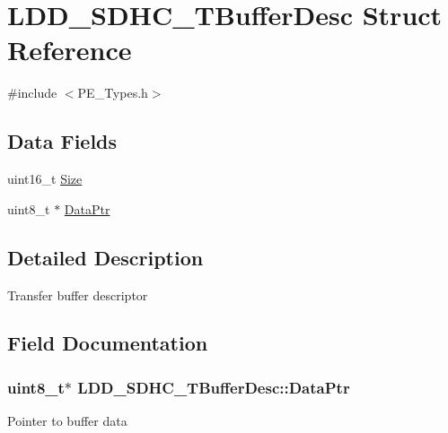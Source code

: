 \hypertarget{struct_l_d_d___s_d_h_c___t_buffer_desc}{}\section{L\+D\+D\+\_\+\+S\+D\+H\+C\+\_\+\+T\+Buffer\+Desc Struct Reference}
\label{struct_l_d_d___s_d_h_c___t_buffer_desc}


{\ttfamily \#include $<$P\+E\+\_\+\+Types.\+h$>$}

\subsection*{Data Fields}
\begin{DoxyCompactItemize}
\item 
uint16\+\_\+t \hyperlink{struct_l_d_d___s_d_h_c___t_buffer_desc_a117f5acff1ada72194a95b38795bca56}{Size}
\item 
uint8\+\_\+t $\ast$ \hyperlink{struct_l_d_d___s_d_h_c___t_buffer_desc_a0349f594a37791792e4a213111173a68}{Data\+Ptr}
\end{DoxyCompactItemize}


\subsection{Detailed Description}
Transfer buffer descriptor 

\subsection{Field Documentation}
\subsubsection[{\texorpdfstring{Data\+Ptr}{DataPtr}}]{\setlength{\rightskip}{0pt plus 5cm}uint8\+\_\+t$\ast$ L\+D\+D\+\_\+\+S\+D\+H\+C\+\_\+\+T\+Buffer\+Desc\+::\+Data\+Ptr}\hypertarget{struct_l_d_d___s_d_h_c___t_buffer_desc_a0349f594a37791792e4a213111173a68}{}\label{struct_l_d_d___s_d_h_c___t_buffer_desc_a0349f594a37791792e4a213111173a68}
Pointer to buffer data 
